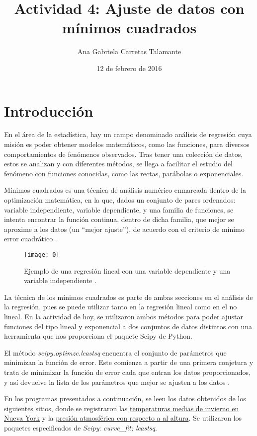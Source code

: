 \documentclass[12pt]{article}
\title{Actividad 4: Ajuste de datos con mínimos cuadrados}
\author{Ana Gabriela Carretas Talamante}
\date{12 de febrero de 2016}
\begin{document}
\maketitle
\section{Introducción}
En el área de la estadística, hay un campo denominado análisis de regresión cuya misión es poder obtener modelos matemáticos, como las funciones, para diversos comportamientos de fenómenos observados. Tras tener una colección de datos, estos se analizan y con diferentes métodos, se llega a facilitar el estudio del fenómeno con funciones conocidas, como las rectas, parábolas o exponenciales.

Mínimos cuadrados es una técnica de análisis numérico enmarcada dentro de la optimización matemática, en la que, dados un conjunto de pares ordenados: variable independiente, variable dependiente, y una familia de funciones, se intenta encontrar la función continua, dentro de dicha familia, que mejor se aproxime a los datos (un ``mejor ajuste''), de acuerdo con el criterio de mínimo error cuadrático \cite{W}. 

\begin{figure}[H]
\centering
\texttt{[image: 0]}
\caption{Ejemplo de una regresión lineal con una variable dependiente y una variable independiente \cite{L}.}
\end{figure}

La técnica de los mínimos cuadrados es parte de ambas secciones en el análisis de la regresión, pues se puede utilizar tanto en la regresión lineal como en el no lineal. En la actividad de hoy, se utilizaron ambos métodos para poder ajustar funciones del tipo lineal y exponencial a dos conjuntos de datos distintos con una herramienta que nos proporciona el paquete Scipy de Python.

El método \textit{scipy.optimze.leastsq} encuentra el conjunto de parámetros que minimizan la función de error. Este comienza a partir de una primera conjetura y trata de minimizar la función de error cada que entran los datos proporcionados, y así devuelve la lista de los parámetros que mejor se ajusten a los datos \cite{Q}. 

En los programas presentados a continuación, se leen los datos obtenidos de los siguientes sitios, donde se registraron las \href{http://www.seattlecentral.edu/qelp/sets/048/048.html}{temperaturas medias de invierno en Nueva York} y la \href{http://www.seattlecentral.edu/qelp/sets/024/024.html}{presión atmosférica con respecto a al altura}. Se utilizaron los paquetes especificados de \textit{Scipy}: \textit{curve\_fit; leastsq}.
\end{document}
